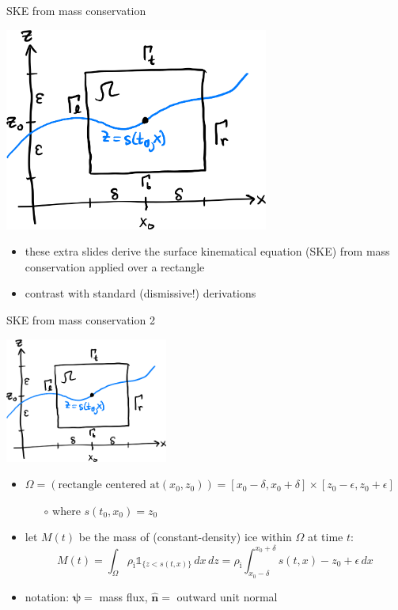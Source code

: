 \documentclass[10pt,dvipsnames]{beamer}
\newcommand{\hbn}{\hat{\mathbf{n}}}
\newcommand{\bpsi}{\bm{\psi}}
\newcommand{\eps}{\epsilon}
\newcommand{\rhoi}{\rho_{\text{i}}}
\begin{document}
\begin{frame}{SKE from mass conservation}
\begin{center}
\includegraphics[width=0.65\textwidth]{skederive.png}
\end{center}

\begin{itemize}
\item these extra slides derive the surface kinematical equation (SKE) from mass conservation applied over a rectangle
\item contrast with standard (dismissive!) derivations \cite{GreveBlatter2009,SchoofHewitt2013}
\end{itemize}
\end{frame}


\begin{frame}{SKE from mass conservation 2}
\begin{center}
\includegraphics[width=0.4\textwidth]{skederive.png}
\end{center}

\begin{itemize}
\item $\Omega = (\text{rectangle centered at} (x_0,z_0)) =[x_0-\delta,x_0+\delta] \times [z_0-\eps,z_0+\eps]$

    \begin{itemize}
    \item[$\circ$] where $s(t_0,x_0)=z_0$
    \end{itemize}
\item let $M(t)$ be the mass of (constant-density) ice within $\Omega$ at time $t$:
   $$M(t) = \int_\Omega \rhoi \mathbb{1}_{\{z<s(t,x)\}}\,dx\,dz = \rhoi \int_{x_0-\delta}^{x_0+\delta} s(t,x) - z_0 + \eps\,dx$$
\item notation: $\bpsi =$ mass flux, $\hbn =$ outward unit normal
\end{itemize}
\end{frame}
\end{document}
